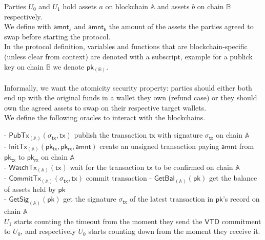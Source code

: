 \documentclass{article}      	%
\begin{document}

Parties $U_0$ and $U_1$ hold assets $a$ on blockchain $\mathbb{A}$ and assets $b$ on chain $\mathbb{B}$ respectively. \\
We define with $\mathsf{amnt_a}$ and $\mathsf{amnt_b}$ the amount of the assets the parties agreed to swap before starting the protocol. \\
In the protocol definition, variables and functions that are blockchain-specific (unless clear from context) are denoted with a subscript, example for a publick key on chain $\mathbb{B}$ we denote $\mathsf{pk_{(\mathbb{B})}}$. \\
\\

Informally, we want the atomicity security property: parties should either both end up with the original funds in a wallet they own (refund case) or they should own the agreed assets to swap on their respective target wallets. \\

We define the following oracles to interact with the blockchains.

- $\mathsf{PubTx}_{(\mathbb{A})}(\sigma_{\mathsf{tx}}, \mathsf{tx})$ publish the transaction $\mathsf{tx}$ with signature $\sigma_{\mathsf{tx}}$ on chain $\mathbb{A}$ \\
- $\mathsf{InitTx}_{(\mathbb{A})}(\mathsf{pk_{tx}}, \mathsf{pk_{rx}}, \mathsf{amnt})$ create an unsigned transaction paying $\mathsf{amnt}$ from $\mathsf{pk_{tx}}$ to $\mathsf{pk_{rx}}$ on chain $\mathbb{A}$ \\
- $\mathsf{WatchTx}_{(\mathbb{A})}(\mathsf{tx})$ wait for the transaction $\mathsf{tx}$ to be confirmed on chain $\mathbb{A}$ \\
- $\mathsf{CommitTx}_{(\mathbb{A})}(\sigma_{\mathsf{tx}}, \mathsf{tx})$ commit transaction
- $\mathsf{GetBal}_{(\mathbb{A})}(\mathsf{pk})$ get the balance of assets held by $\mathsf{pk}$ \\
- $\mathsf{GetSig}_{(\mathbb{A})}(\mathsf{pk})$ get the signature $\sigma_{\mathsf{tx}}$ of the latest transaction in $\mathsf{pk}$'s record on chain $\mathbb{A}$ \\

$U_1$ starts counting the timeout from the moment they send the $\mathsf{VTD}$ commitment to $U_0$, and respectively $U_0$ starts counting down from the moment they receive it. \\
\\
\end{document}
